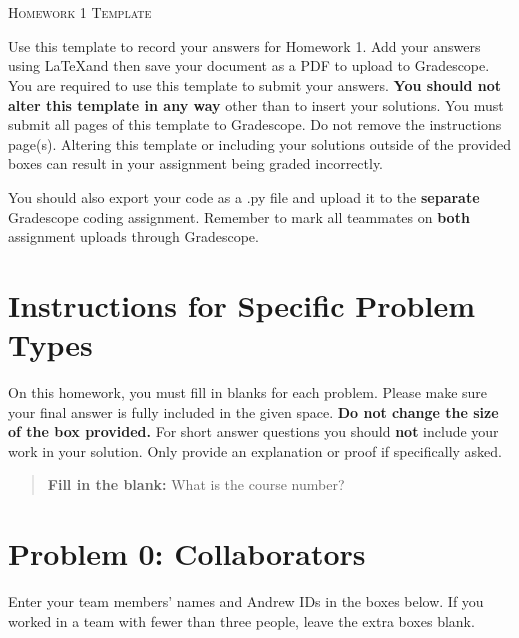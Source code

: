 \documentclass[12pt]{article}
\begin{document}
\section*{}
\begin{center}
  \centerline{\textsc{\LARGE  Homework 1 Template}}
\end{center}

Use this template to record your answers for Homework 1.  Add your answers using \LaTeX and then save your document as a PDF to upload to Gradescope.  You are required to use this template to submit your answers.  \textbf{You should not alter this template in any way} other than to insert your solutions.  You must submit all \pageref{LastPage} pages of this template to Gradescope.  Do not remove the instructions page(s).  Altering this template or including your solutions outside of the provided boxes can result in your assignment being graded incorrectly.

You should also export your code as a .py file and upload it to the \textbf{separate} Gradescope coding assignment. Remember to mark all teammates on \textbf{both} assignment uploads through Gradescope.

\section*{Instructions for Specific Problem Types}

On this homework, you must fill in blanks for each problem. Please make sure your final answer is fully included in the given space.  \textbf{Do not change the size of the box provided.}  For short answer questions you should \textbf{not} include your work in your solution.  Only provide an explanation or proof if specifically asked.

\begin{quote}
\textbf{Fill in the blank:} What is the course number?

\begin{tcolorbox}[fit,height=1cm, width=4cm, blank, borderline={1pt}{-2pt},nobeforeafter]
    \begin{center} \end{center}
    \end{tcolorbox}
\end{quote}

\newpage

\section*{Problem 0: Collaborators}
Enter your team members' names and Andrew IDs in the boxes below. If you worked in a team with fewer than three people, leave the extra boxes blank.
\end{document}
